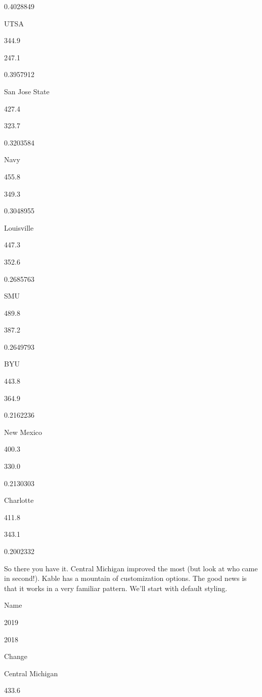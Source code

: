 \documentclass[]{book}
\newenvironment{Shaded}{\begin{snugshade}}{\end{snugshade}}
\newcommand{\KeywordTok}[1]{\textcolor[rgb]{0.13,0.29,0.53}{\textbf{#1}}}
\newcommand{\NormalTok}[1]{#1}
\newcommand{\OperatorTok}[1]{\textcolor[rgb]{0.81,0.36,0.00}{\textbf{#1}}}
\newcommand{\StringTok}[1]{\textcolor[rgb]{0.31,0.60,0.02}{#1}}
\begin{document}
0.4028849

UTSA

344.9

247.1

0.3957912

San Jose State

427.4

323.7

0.3203584

Navy

455.8

349.3

0.3048955

Louisville

447.3

352.6

0.2685763

SMU

489.8

387.2

0.2649793

BYU

443.8

364.9

0.2162236

New Mexico

400.3

330.0

0.2130303

Charlotte

411.8

343.1

0.2002332

So there you have it. Central Michigan improved the most (but look at who came in second!). Kable has a mountain of customization options. The good news is that it works in a very familiar pattern. We'll start with default styling.

\begin{Shaded}
\end{Shaded}

Name

2019

2018

Change

Central Michigan

433.6
\end{document}
